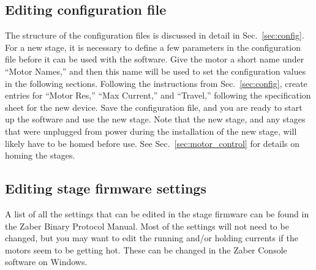 \subsection{Editing configuration file}

The structure of the configuration files is discussed in detail in
Sec.~\ref{sec:config}. For a new stage, it is necessary to define a few
parameters in the configuration file before it can be used with the
software. Give the motor a short name under ``Motor Names,'' and then this name
will be used to set the configuration values in the following
sections. Following the instructions from Sec.~\ref{sec:config}, create entries
for ``Motor Res,'' ``Max Current,'' and ``Travel,'' following the specification
sheet for the new device. Save the configuration file, and you are ready to
start up the software and use the new stage. Note that the new stage, and any
stages that were unplugged from power during the installation of the new stage,
will likely have to be homed before use. See Sec.~\ref{sec:motor_control} for
details on homing the stages.

\subsection{Editing stage firmware settings}

A list of all the settings that can be edited in the stage firmware can be found
in the Zaber Binary Protocol Manual\cite{zaber_bin_protocol}. Most of the
settings will not need to be changed, but you may want to edit the running
and/or holding currents if the motors seem to be getting hot. These can be
changed in the Zaber Console software on Windows.

